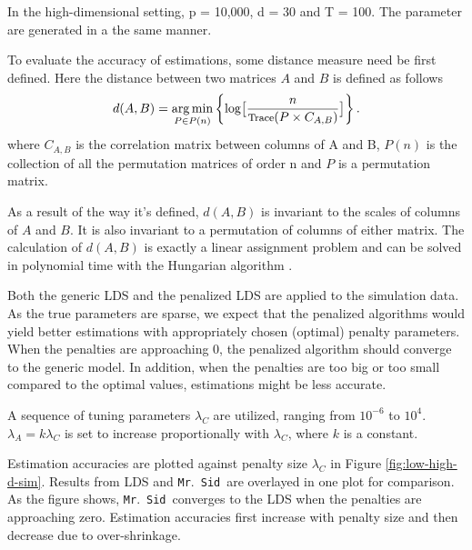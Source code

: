 \documentclass[fleqn]{article}
\let\oldref\ref
\renewcommand{\ref}[1]{(\oldref{#1})}
\newcommand{\mrsid}{{\sc \texttt{Mr}.~\texttt{Sid}}}
\DeclareMathOperator*{\argmin}{arg\,min}
\begin{document}
In the high-dimensional setting, p = 10,000, d = 30 and T = 100. The parameter are generated in a the same manner.

To evaluate the accuracy of estimations, some distance measure need be first defined. Here the distance between two matrices $A$ and $B$ is defined as follows
\begin{equation}\label{eq:distance}
d(A,B) = \argmin_{P\in P(n)}\left\{\log\bigl[\frac{n}{\text{\footnotesize Trace}(P\times C_{A,B})}\bigr]\right\}.
\end{equation}
where $C_{A,B}$ is the correlation matrix between columns of A and B, $P(n)$ is the collection of all the permutation matrices of order n and $P$ is a permutation matrix.

As a result of the way it's defined, $d(A,B)$ is invariant to the scales of columns of $A$ and $B$. It is also invariant to a permutation of columns of either matrix. The calculation of $d(A,B)$ is exactly a linear assignment problem and can be solved in polynomial time with the Hungarian algorithm \cite{kuhn1955hungarian}.


Both the generic LDS and the penalized LDS are applied to the simulation data. As the true parameters are sparse, we expect that the penalized algorithms would yield better estimations with appropriately chosen (optimal) penalty parameters. When the penalties are approaching 0, the penalized algorithm should converge to the generic model. In addition, when the penalties are too big or too small compared to the optimal values, estimations might be less accurate.

A sequence of tuning parameters $\lambda_C$ are utilized, ranging from $10^{-6}$ to $10^4$. $\lambda_A = k \lambda_C$ is set to increase proportionally with $\lambda_C$, where $k$ is a constant.

Estimation accuracies are plotted against penalty size $\lambda_C$ in Figure \oldref{fig:low-high-d-sim}. Results from LDS and \mrsid~are overlayed in one plot for comparison. As the figure shows, \mrsid~converges to the LDS when the penalties are approaching zero. Estimation accuracies first increase with penalty size and then decrease due to over-shrinkage.
\end{document}
